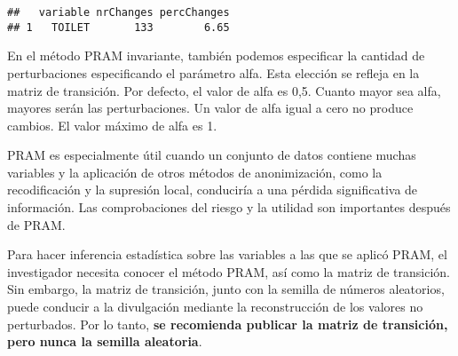 \documentclass[
]{book}
\newenvironment{Shaded}{\begin{snugshade}}{\end{snugshade}}
\newcommand{\AttributeTok}[1]{\textcolor[rgb]{0.77,0.63,0.00}{#1}}
\newcommand{\CommentTok}[1]{\textcolor[rgb]{0.56,0.35,0.01}{\textit{#1}}}
\newcommand{\FloatTok}[1]{\textcolor[rgb]{0.00,0.00,0.81}{#1}}
\newcommand{\FunctionTok}[1]{\textcolor[rgb]{0.00,0.00,0.00}{#1}}
\newcommand{\NormalTok}[1]{#1}
\newcommand{\OtherTok}[1]{\textcolor[rgb]{0.56,0.35,0.01}{#1}}
\newcommand{\SpecialCharTok}[1]{\textcolor[rgb]{0.00,0.00,0.00}{#1}}
\newcommand{\StringTok}[1]{\textcolor[rgb]{0.31,0.60,0.02}{#1}}
\theoremstyle{definition}
\theoremstyle{definition}
\theoremstyle{definition}
\theoremstyle{definition}
\theoremstyle{remark}
\begin{document}
\begin{Shaded}
\end{Shaded}

\begin{verbatim}
##   variable nrChanges percChanges
## 1   TOILET       133        6.65
\end{verbatim}

En el método PRAM invariante, también podemos especificar la cantidad de perturbaciones especificando el parámetro alfa. Esta elección se refleja en la matriz de transición. Por defecto, el valor de alfa es 0,5. Cuanto mayor sea alfa, mayores serán las perturbaciones. Un valor de alfa igual a cero no produce cambios. El valor máximo de alfa es 1.

PRAM es especialmente útil cuando un conjunto de datos contiene muchas variables y la aplicación de otros métodos de anonimización, como la recodificación y la supresión local, conduciría a una pérdida significativa de información. Las comprobaciones del riesgo y la utilidad son importantes después de PRAM.

Para hacer inferencia estadística sobre las variables a las que se aplicó PRAM, el investigador necesita conocer el método PRAM, así como la matriz de transición. Sin embargo, la matriz de transición, junto con la semilla de números aleatorios, puede conducir a la divulgación mediante la reconstrucción de los valores no perturbados. Por lo tanto, \textbf{se recomienda publicar la matriz de transición, pero nunca la semilla aleatoria}.
\end{document}
